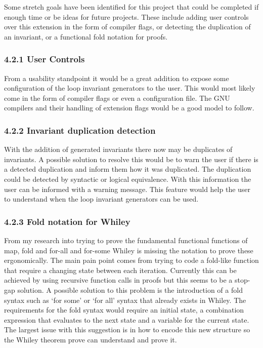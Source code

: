 \documentclass[11pt, a4paper, twoside, openright]{report}
\begin{document}
Some stretch goals have been identified for this project that could
be completed if enough time or be ideas for future projects.
These include adding user controls over this extension in the
form of compiler flags, or detecting the duplication of an invariant,
or a functional fold notation for proofs.

\subsubsection*{4.2.1 User Controls}
From a usability standpoint it would be a great addition to expose
some configuration of the loop invariant generators to the user.
This would most likely come in the form of compiler flags or even
a configuration file. The GNU compilers and their handling of
extension flags would be a good model to follow.

\subsubsection*{4.2.2 Invariant duplication detection}
With the addition of generated invariants there now may be
duplicates of invariants. A possible solution to resolve this would
be to warn the user if there is a detected duplication and
inform them how it was duplicated.
The duplication could be detected by syntactic or logical equivalence.
With this information the user can be informed with a warning message.
This feature would help the user to understand when the loop invariant
generators can be used.

\subsubsection*{4.2.3 Fold notation for Whiley}
From my research into trying to prove the fundamental functional functions of
map, fold and for-all and for-some Whiley is missing the notation to prove
these ergonomically. The main pain point comes from trying to code a fold-like
function that require a changing state between each iteration. Currently this
can be achieved by using recursive function calls in proofs but this seems to
be a stop-gap solution. A possible solution to this problem is the
introduction of a fold syntax such as `for some' or `for all' syntax that
already exists in Whiley. The requirements for the fold syntax would require
an initial state, a combination expression that evaluates to the next state
and a variable for the current state.
The largest issue with this suggestion is in how to encode this new structure
so the Whiley theorem prove can understand and prove it.
\end{document}
